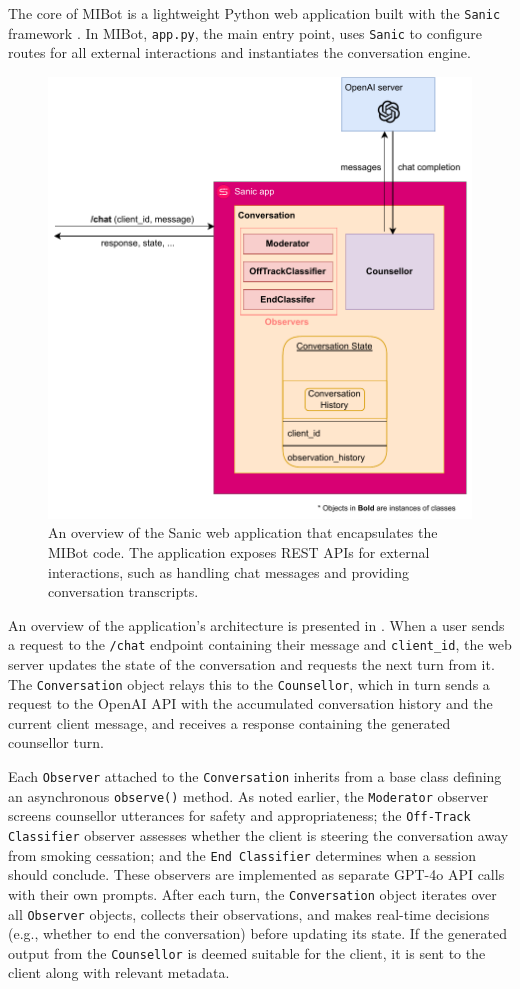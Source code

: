 The core of MIBot is a lightweight Python web application built with the \texttt{Sanic} framework \citep{pi_sanic}. In MIBot, \texttt{app.py}, the main entry point, uses \texttt{Sanic} to configure routes for all external interactions and instantiates the conversation engine.
\begin{figure}[ht]
  \centering
  \includegraphics[width=0.7\linewidth]{fig/microservice.drawio.pdf} 
  \caption[MIBot Sanic Application Overview]{An overview of the Sanic web application that encapsulates the MIBot code. The application exposes REST APIs for external interactions, such as handling chat messages and providing conversation transcripts.}
  \label{fig:microservice}
\end{figure}
An overview of the application's architecture is presented in . When a user sends a request to the \texttt{/chat} endpoint containing their message and \texttt{client\_id}, the web server updates the state of the conversation and requests the next turn from it. The \texttt{Conversation} object relays this to the \texttt{Counsellor}, which in turn sends a request to the OpenAI API with the accumulated conversation history and the current client message, and receives a response containing the generated counsellor turn.

Each \texttt{Observer} attached to the \texttt{Conversation} inherits from a base class defining an asynchronous \texttt{observe()} method. As noted earlier, the \texttt{Moderator} observer screens counsellor utterances for safety and appropriateness; the \texttt{Off-Track Classifier} observer assesses whether the client is steering the conversation away from smoking cessation; and the \texttt{End Classifier} determines when a session should conclude. These observers are implemented as separate GPT-4o API calls with their own prompts. After each turn, the \texttt{Conversation} object iterates over all \texttt{Observer} objects, collects their observations, and makes real-time decisions (e.g., whether to end the conversation) before updating its state. If the generated output from the \texttt{Counsellor} is deemed suitable for the client, it is sent to the client along with relevant metadata.

